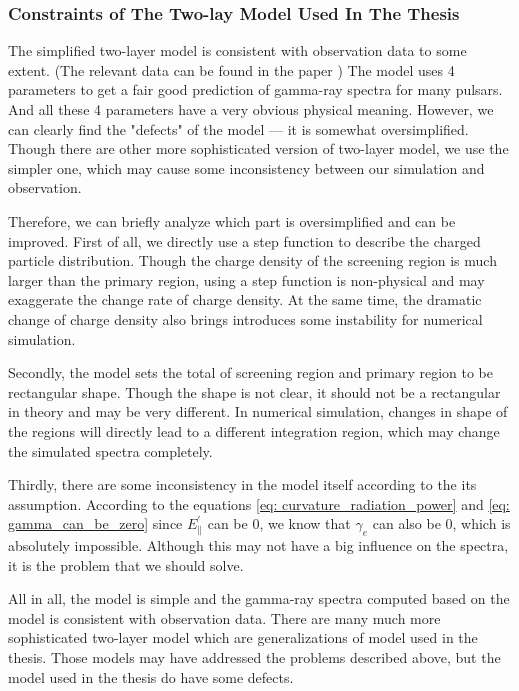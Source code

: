 \documentclass[12pt]{report}
\begin{document}
      \subsubsection{Constraints of The Two-lay Model Used In The Thesis} 
        The simplified two-layer model is consistent with observation data to some extent. 
        (The relevant data can be found in the paper 
        \href{http://iopscience.iop.org/article/10.1088/0004-637X/720/1/178/pdf}
        {})
        The model uses 4 parameters to get a fair good prediction of gamma-ray spectra for many 
        pulsars. And all these 4 parameters have a very obvious physical meaning. 
        However, we can clearly find the "defects" of the model --- it is somewhat oversimplified. 
        Though there are other more sophisticated version of two-layer model, we use the simpler one, 
        which may cause some inconsistency between our simulation and observation. 

        Therefore, we can briefly analyze which part is oversimplified and can be improved. 
        First of all, we directly use a step function to describe the charged particle distribution. 
        Though the charge density of the screening region is much larger than the primary region, using 
        a step function is non-physical and may exaggerate the change rate of charge density. At the 
        same time, the dramatic change of charge density also brings introduces some instability for 
        numerical simulation. 

        Secondly, the model sets the total of screening region and primary region to be rectangular shape. 
        Though the shape is not clear, it should not be a rectangular in theory and may be very different.
        In numerical simulation, changes in shape of the regions will directly lead to a different 
        integration region, which may change the simulated spectra completely.

        Thirdly, there are some inconsistency in the model itself according to the its assumption. 
        According to the equations \ref{eq: curvature_radiation_power} and \ref{eq: gamma_can_be_zero}
        since $E_{\parallel}^{\prime}$ can be $0$, we know that 
        $\gamma_{e}$ can also be $0$, which is absolutely impossible. Although this may not have a big 
        influence on the spectra, it is the problem that we should solve. 

        All in all, the model is simple and the gamma-ray spectra computed based on the model is 
        consistent with observation data. There are many much more sophisticated two-layer model 
        which are generalizations of model used in the thesis. Those models may have addressed the 
        problems described above, but the model used in the thesis do have some defects. 
\end{document}
